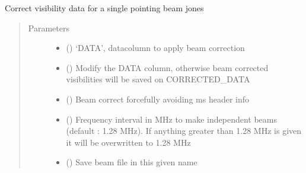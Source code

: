 \documentclass[letterpaper,10pt,english]{sphinxmanual}
\begin{document}
\begin{fulllineitems}
\begin{fulllineitems}
\label{\detokenize{paircars:paircars.fullpol_selfcal_LTS.PolSelfcal.correct_visibility_single_beam_jones}}
\sphinxAtStartPar
Correct visibility data for a single pointing beam jones
\begin{quote}\begin{description}
\item[{Parameters}] \leavevmode\begin{itemize}
\item {} 
\sphinxAtStartPar
{} () \textendash{} ‘DATA’, datacolumn to apply beam correction

\item {} 
\sphinxAtStartPar
{} () \textendash{} Modify the DATA column, otherwise beam corrected visibilities will be saved on CORRECTED\_DATA

\item {} 
\sphinxAtStartPar
{} () \textendash{} Beam correct forcefully avoiding ms header info

\item {} 
\sphinxAtStartPar
{} () \textendash{} Frequency interval in MHz to make independent beams (default : 1.28 MHz). If anything greater than 1.28 MHz is given it will be overwritten to 1.28 MHz

\item {} 
\sphinxAtStartPar
{} () \textendash{} Save beam file in this given name

\end{itemize}


\end{description}
\end{quote}
\end{fulllineitems}
\end{fulllineitems}
\end{document}
